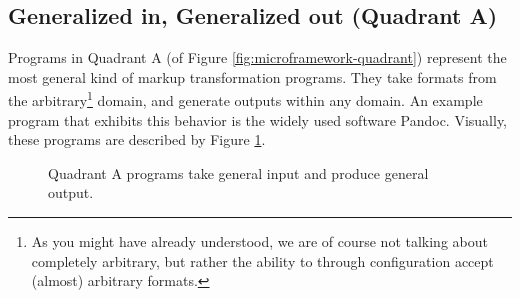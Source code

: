 \documentclass{scrreprt}
\begin{document}
\subsection{Generalized in, Generalized out (Quadrant A)}
Programs in Quadrant A (of Figure \ref{fig:microframework-quadrant}) represent the most general kind of markup transformation programs. They take formats from the arbitrary\footnote{As you might have already understood, we are of course not talking about completely arbitrary, but rather the ability to through configuration accept (almost) arbitrary formats.} domain, and generate outputs within any domain. An example program that exhibits this behavior is the widely used software Pandoc. Visually, these programs are described by Figure \ref{fig:workflows-framework-gen-in-gen-out}.

\begin{figure}[h]
  \centering


  \caption{Quadrant A programs take general input and produce general output.}
  \label{fig:workflows-framework-gen-in-gen-out}
\end{figure}

\end{document}
